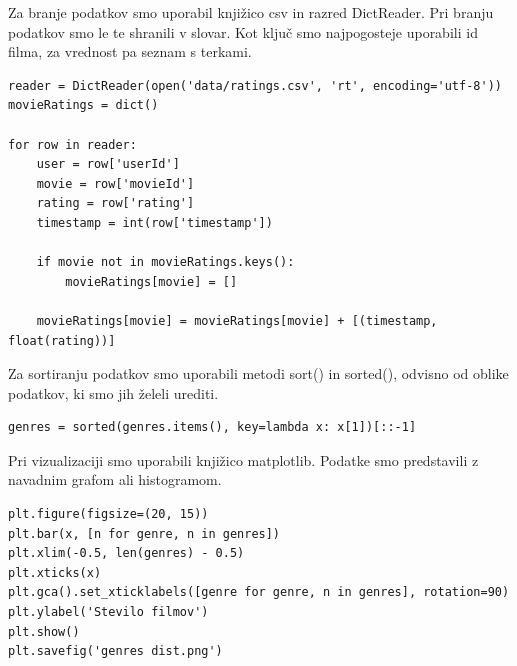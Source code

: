 \documentclass[a4paper,11pt]{article}
\begin{document}
%
%
%
%

Za branje podatkov smo uporabil knjižico csv in razred DictReader. Pri branju
podatkov smo le te shranili v slovar. Kot ključ smo najpogosteje uporabili
id filma, za vrednost pa seznam s terkami.
\begin{lstlisting}
reader = DictReader(open('data/ratings.csv', 'rt', encoding='utf-8'))
movieRatings = dict()

for row in reader:
    user = row['userId']
    movie = row['movieId']
    rating = row['rating']
    timestamp = int(row['timestamp'])

    if movie not in movieRatings.keys():
        movieRatings[movie] = []

    movieRatings[movie] = movieRatings[movie] + [(timestamp, float(rating))]
\end{lstlisting}

Za sortiranju podatkov smo uporabili metodi sort() in sorted(), odvisno od
oblike podatkov, ki smo jih želeli urediti.
\begin{lstlisting}
genres = sorted(genres.items(), key=lambda x: x[1])[::-1]
\end{lstlisting}

Pri vizualizaciji smo uporabili knjižico matplotlib. Podatke smo predstavili
z navadnim grafom ali histogramom.
\begin{lstlisting}
plt.figure(figsize=(20, 15))
plt.bar(x, [n for genre, n in genres])
plt.xlim(-0.5, len(genres) - 0.5)
plt.xticks(x)
plt.gca().set_xticklabels([genre for genre, n in genres], rotation=90)
plt.ylabel('Stevilo filmov')
plt.show()
plt.savefig('genres dist.png')
\end{lstlisting}
\end{document}
